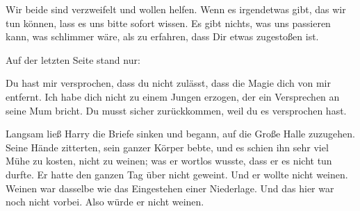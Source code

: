 \begin{writtenNote}
Wir beide sind verzweifelt und wollen helfen. Wenn es irgendetwas gibt, das wir tun können, lass es uns bitte sofort wissen. Es gibt nichts, was uns passieren kann, was schlimmer wäre, als zu erfahren, dass Dir etwas zugestoßen ist.

\end{writtenNote}

Auf der letzten Seite stand nur:

\begin{writtenNote}
Du hast mir versprochen, dass du nicht zulässt, dass die Magie dich von mir entfernt. Ich habe dich nicht zu einem Jungen erzogen, der ein Versprechen an seine Mum bricht. Du musst sicher zurückkommen, weil du es versprochen hast.

\end{writtenNote}

Langsam ließ Harry die Briefe sinken und begann, auf die Große Halle zuzugehen. Seine Hände zitterten, sein ganzer Körper bebte, und es schien ihn sehr viel Mühe zu kosten, nicht zu weinen; was er wortlos wusste, dass er es nicht tun durfte. Er hatte den ganzen Tag über nicht geweint. Und er wollte nicht weinen. Weinen war dasselbe wie das Eingestehen einer Niederlage. Und das hier war noch nicht vorbei. Also würde er nicht weinen.

\later

